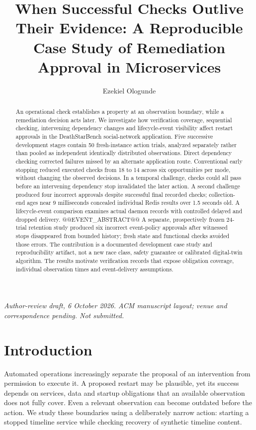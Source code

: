 \documentclass[manuscript,review,nonacm]{acmart}
\title{When Successful Checks Outlive Their Evidence: A Reproducible Case Study of Remediation Approval in Microservices}
\author{Ezekiel Ologunde}
\affiliation{\institution{Independent Researcher}}
\begin{document}
\begin{abstract}
An operational check establishes a property at an observation boundary, while a remediation decision acts later. We investigate how verification coverage, sequential checking, intervening dependency changes and lifecycle-event visibility affect restart approvals in the DeathStarBench social-network application. Five successive development stages contain 50 fresh-instance action trials, analyzed separately rather than pooled as independent identically distributed observations. Direct dependency checking corrected failures missed by an alternate application route. Conventional early stopping reduced executed checks from 18 to 14 across six opportunities per mode, without changing the observed decisions. In a temporal challenge, checks could all pass before an intervening dependency stop invalidated the later action. A second challenge produced four incorrect approvals despite successful final recorded checks; collection-end ages near 9 milliseconds concealed individual Redis results over 1.5 seconds old. A lifecycle-event comparison examines actual daemon records with controlled delayed and dropped delivery. @@EVENT_ABSTRACT@@ A separate, prospectively frozen 24-trial retention study produced six incorrect event-policy approvals after witnessed stops disappeared from bounded history; fresh state and functional checks avoided those errors. The contribution is a documented development case study and reproducibility artifact, not a new race class, safety guarantee or calibrated digital-twin algorithm. The results motivate verification records that expose obligation coverage, individual observation times and event-delivery assumptions.
\end{abstract}
\maketitle
\noindent\textit{Author-review draft, 6 October 2026. ACM manuscript layout; venue and correspondence pending. Not submitted.}

\section{Introduction}
Automated operations increasingly separate the proposal of an intervention from permission to execute it. A proposed restart may be plausible, yet its success depends on services, data and startup obligations that an available observation does not fully cover. Even a relevant observation can become outdated before the action. We study these boundaries using a deliberately narrow action: starting a stopped timeline service while checking recovery of synthetic timeline content.
\end{document}
